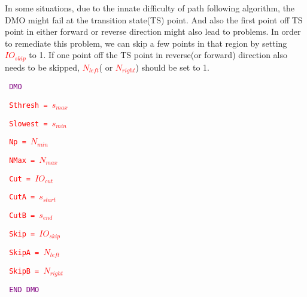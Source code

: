 In some situations, due to the innate difficulty of path following algorithm, the DMO might fail at the transition state(TS) point. And also the first point off TS point in either forward or reverse direction might also lead to problems. In order to remediate this problem, we can skip a few points in that region by setting \texttt{\textcolor{red}{$IO_{skip}$}} to 1. If one point off the TS point in reverse(or forward) direction also needs to be skipped, \texttt{\textcolor{red}{$N_{left}$}}( or \texttt{\textcolor{red}{$N_{right}$}}) should be set to 1. 




\texttt{
\textcolor{Purple}{DMO}}

\texttt{
\textcolor{red}{Sthresh = $s_{max}$}}

\texttt{
\textcolor{red}{Slowest = $s_{min}$}}


\texttt{
\textcolor{red}{Np = $N_{min}$}}


\texttt{
\textcolor{red}{NMax = $N_{max}$}}


\texttt{
\textcolor{red}{Cut = $IO_{cut}$}}

\texttt{
\textcolor{red}{CutA = $s_{start}$}}

\texttt{
    \textcolor{red}{CutB = $s_{end}$}}


\texttt{
\textcolor{red}{Skip = $IO_{skip}$}}

\texttt{
\textcolor{red}{SkipA = $N_{left}$}}

\texttt{
\textcolor{red}{SkipB = $N_{right}$}}

\texttt{
\textcolor{Purple}{END DMO}}


